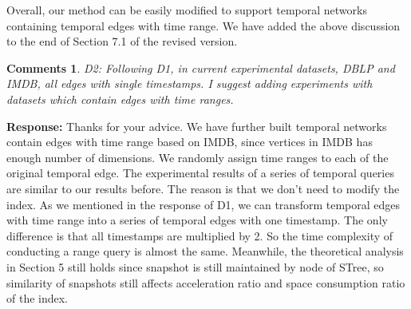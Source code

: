 \documentclass{article}
\newtheorem{Comments}{\textbf{Comments}}
\begin{document}
Overall, our method can be easily modified to support temporal networks containing temporal edges with time range. We have added the above discussion to the end of Section 7.1 of the revised version.

\begin{Comments}
D2: Following D1, in current experimental datasets, DBLP and IMDB, all edges with single timestamps. I suggest adding experiments with datasets which contain edges with time ranges.
\end{Comments}
\noindent \textbf{Response:} Thanks for your advice. We have further built temporal networks contain edges with time range based on IMDB, since vertices in IMDB has enough number of dimensions. We randomly assign time ranges to each of the original temporal edge. The experimental results of a series of temporal queries are similar to our results before. The reason is that we don't need to modify the index. As we mentioned in the response of D1, we can transform temporal edges with time range into a series of temporal edges with one timestamp. The only difference is that all timestamps are multiplied by 2. So the time complexity of conducting a range query is almost the same. Meanwhile, the theoretical analysis in Section 5 still holds since snapshot is still maintained by node of STree, so similarity of snapshots still affects acceleration ratio and space consumption ratio of the index.
\end{document}
